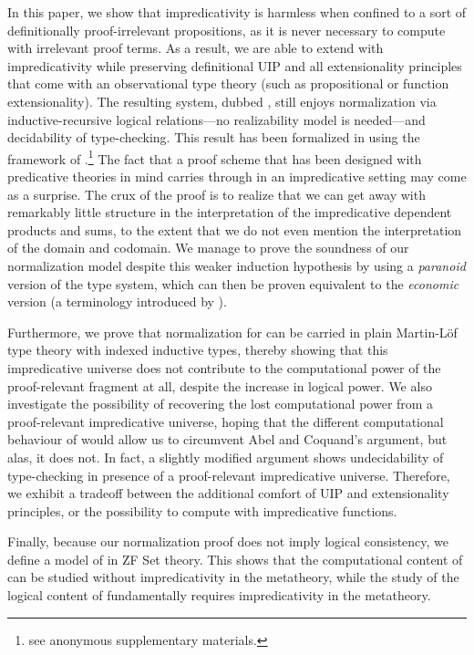 In this paper, we show that impredicativity is harmless when confined
to a sort of definitionally proof-irrelevant propositions, as it is never
necessary to compute with irrelevant proof terms.
%
As a result, we are able to extend \SetoidTT with impredicativity while
preserving definitional UIP and all extensionality principles that come
with an observational type theory (such as propositional or function
extensionality).
%
The resulting system, dubbed \SetoidCC, still enjoys
normalization via inductive-recursive logical relations---no
realizability model is needed---and decidability of type-checking.
%
This result has been formalized in \Agda using the framework of
.\footnote{see anonymous supplementary
  materials.}
%
The fact that a proof scheme that has been designed with predicative
theories in mind carries through in an impredicative setting
may come as a surprise.
%
The crux of the proof is to realize that we can get away with
remarkably little structure in the interpretation of the impredicative
dependent products and sums, to the extent that we do not even mention the
interpretation of the domain and codomain.
%
We manage to prove the soundness of our normalization model
despite this weaker induction hypothesis by using a \emph{paranoid}
version of the type system, which can then be proven equivalent to the
\emph{economic} version (a terminology introduced by
).

%
Furthermore, we prove that normalization for \SetoidCC can be
carried in plain Martin-Löf type theory with indexed inductive types,
thereby showing that this impredicative universe does not contribute
to the computational power of the proof-relevant fragment at all,
despite the increase in logical power.
%
We also investigate the possibility of recovering the lost computational power
from a proof-relevant impredicative universe, hoping that the different
computational behaviour of \SetoidCC would allow us to circumvent Abel and
Coquand's argument, but alas, it does not. In fact, a slightly modified
argument shows undecidability of type-checking in presence of a
proof-relevant impredicative universe.
%
Therefore, we exhibit a tradeoff between the additional comfort of
UIP and extensionality principles, or the possibility to compute with
impredicative functions.

Finally, because our normalization proof does not imply logical
consistency, we define a model of \SetoidCC in ZF Set
theory.
%
This shows that the computational content of \SetoidCC can be studied
without impredicativity in the metatheory, while the study of the
logical content of \SetoidCC fundamentally requires impredicativity in
the metatheory. 


